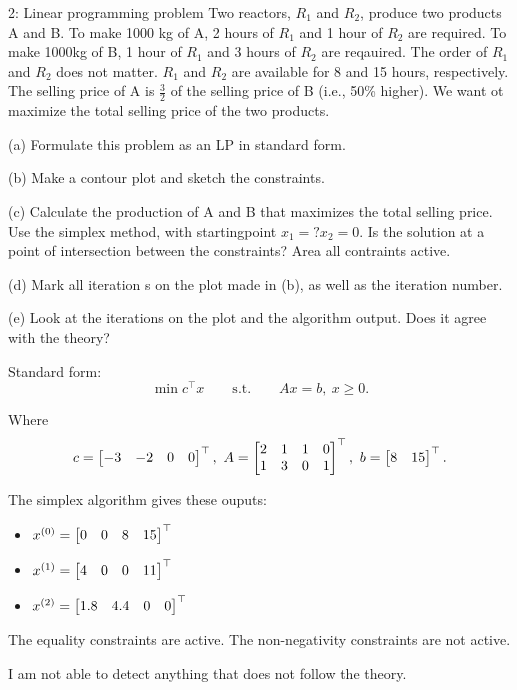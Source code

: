 
\begin{problem}{2: Linear programming problem}
  Two reactors, $R_1$ and $R_2$, produce two products A and B.
  To make 1000 kg of A, 2 hours of $R_1$ and 1 hour of $R_2$ are required. To make 1000kg of B, 1 hour of $R_1$ and 3 hours of 
  $R_2$ are reqauired. The order of $R_1$ and $R_2$ does not matter. $R_1$ and $R_2$ are available for 8 and 15 hours, respectively. 
  The selling price of A is $\frac{3}{2}$ of the selling price of B (i.e., 50\% higher). 
  We want ot maximize the total selling price of the two products. 
  
  \medskip (a) Formulate this problem as an LP in standard form. 
  
  \medskip (b) Make a contour plot and sketch the constraints.
  
  \medskip (c) Calculate the production of A and B that maximizes the total selling price. Use the simplex method, with startingpoint $x_1 = ?x_2 = 0$. 
  Is the solution at a point of intersection between the constraints? Area all contraints active.
  
  \medskip (d) Mark all iteration s on the plot made in (b), as well as the iteration number.
  
  \medskip (e) Look at the iterations on the plot and the algorithm output. Does it agree with the theory?

\end{problem}



Standard form: 
\[
  \min c^{\top}x \qquad\text{s.t.}\qquad Ax = b,\ x \geq 0
.\] 

Where
\[
  c = \begin{bmatrix} -3 & -2 & 0 & 0 \end{bmatrix}^{\top},\  A = \begin{bmatrix} 2 & 1 & 1 & 0 \\ 1 & 3 & 0 & 1 \end{bmatrix}^{\top} ,\ b = \begin{bmatrix} 8  & 15 \end{bmatrix}^{\top}
.\]
\newpage
{}

\begin{center}
\end{center}


The simplex algorithm gives these ouputs:
\begin{itemize}
  \item $x^{(0)} = \begin{bmatrix} 0 & 0 & 8 & 15 \end{bmatrix}^{\top}$
  \item $x^{(1)} = \begin{bmatrix} 4 & 0 & 0 & 11 \end{bmatrix}^{\top}$
  \item $x^{(2)} = \begin{bmatrix} 1.8 & 4.4 & 0 & 0 \end{bmatrix}^{\top}$
\end{itemize}

The equality constraints are active. The non-negativity constraints are not active. 


\begin{center}
\end{center}


I am not able to detect anything that does not follow the theory.
